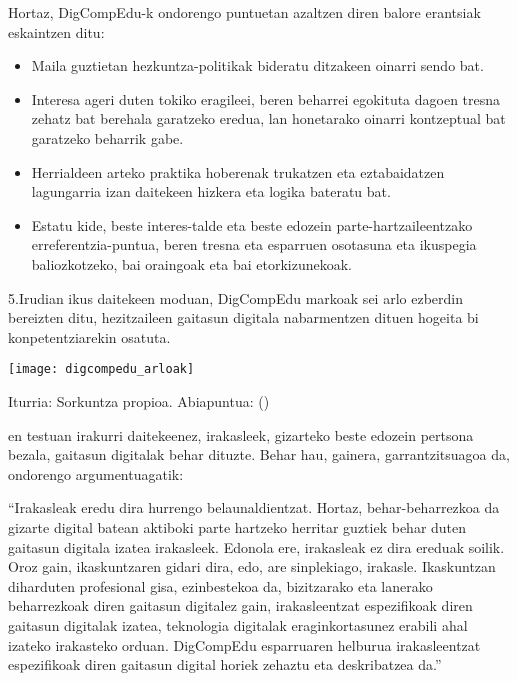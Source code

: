 Hortaz, DigCompEdu-k ondorengo puntuetan azaltzen diren balore erantsiak eskaintzen ditu:

\begin{itemize}
    \item Maila guztietan hezkuntza-politikak bideratu ditzakeen oinarri sendo bat.
    \item Interesa ageri duten tokiko eragileei, beren beharrei egokituta dagoen tresna zehatz bat berehala garatzeko eredua, lan honetarako oinarri kontzeptual bat garatzeko beharrik gabe.
    \item Herrialdeen arteko praktika hoberenak trukatzen eta eztabaidatzen lagungarria izan daitekeen hizkera eta logika bateratu bat.
    \item Estatu kide, beste interes-talde eta beste edozein parte-hartzaileentzako erreferentzia-puntua, beren tresna eta esparruen osotasuna eta ikuspegia baliozkotzeko, bai oraingoak eta bai etorkizunekoak.
\end{itemize}

5.Irudian ikus daitekeen moduan, DigCompEdu markoak sei arlo ezberdin bereizten ditu, hezitzaileen gaitasun digitala nabarmentzen dituen hogeita bi konpetentziarekin osatuta.

\begin{center}
    \label{fig:digcompedu_arloak}
    \texttt{[image: digcompedu\_arloak]}
    \centering
    \par{Iturria: Sorkuntza propioa. Abiapuntua: \citeauthor{JRC107466} (\citeyear{JRC107466})}
\end{center}

\citeauthor{JRC107466}en \citeyear{JRC107466} testuan irakurri daitekeenez, irakasleek, gizarteko beste edozein pertsona bezala, gaitasun digitalak behar dituzte. Behar hau, gainera, garrantzitsuagoa da, ondorengo argumentuagatik:

\begin{adjustwidth}{3em}{0pt}
“Irakasleak eredu dira hurrengo belaunaldientzat. Hortaz, behar-beharrezkoa da gizarte digital batean aktiboki parte hartzeko herritar guztiek behar duten gaitasun digitala izatea irakasleek. Edonola ere, irakasleak ez dira ereduak soilik. Oroz gain, ikaskuntzaren gidari dira, edo, are sinplekiago, irakasle. Ikaskuntzan diharduten profesional gisa, ezinbestekoa da, bizitzarako eta lanerako beharrezkoak diren gaitasun digitalez gain, irakasleentzat espezifikoak diren gaitasun digitalak izatea, teknologia digitalak eraginkortasunez erabili ahal izateko irakasteko orduan. DigCompEdu esparruaren helburua irakasleentzat espezifikoak diren gaitasun digital horiek zehaztu eta deskribatzea da.”
\end{adjustwidth}

